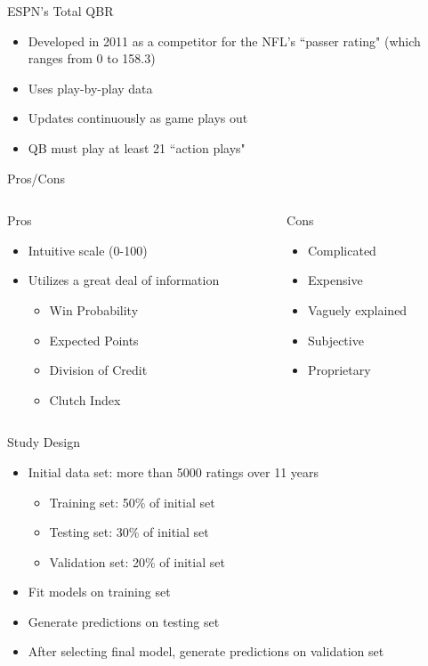 \documentclass{beamer}
\begin{document}
	\begin{frame}{ESPN's Total QBR}
		\begin{itemize}
			\item Developed in 2011 as a competitor for the NFL's ``passer rating" (which ranges from 0 to 158.3)
			\item Uses play-by-play data
			\item Updates continuously as game plays out
			\item QB must play at least 21 ``action plays"
		\end{itemize}
		\begin{block}{Pros/Cons}
		\begin{columns}
			\begin{column}[t]{0.4\textwidth}
				Pros
				\begin{itemize}
					\item Intuitive scale (0-100)
					\item Utilizes a great deal of information
					\begin{itemize}
						\item Win Probability
						\item Expected Points
						\item Division of Credit
						\item Clutch Index
					\end{itemize}
				\end{itemize}
			\end{column}
			
			\begin{column}[t]{0.5\textwidth}
				Cons
				\begin{itemize}
					\item Complicated
					\item Expensive
					\item Vaguely explained
					\item Subjective
					\item Proprietary
				\end{itemize}
			\end{column}
		\end{columns}
		\end{block}
	\end{frame}

	\begin{frame}{Study Design}
		\begin{itemize}
			\item Initial data set: more than 5000 ratings over 11 years
			\begin{itemize}
				\item Training set: 50\% of initial set
				\item Testing set: 30\% of initial set
				\item Validation set: 20\% of initial set
			\end{itemize}
			\item Fit models on training set
			\item Generate predictions on testing set
			\item After selecting final model, generate predictions on validation set
		\end{itemize}
	\end{frame}
\end{document}
